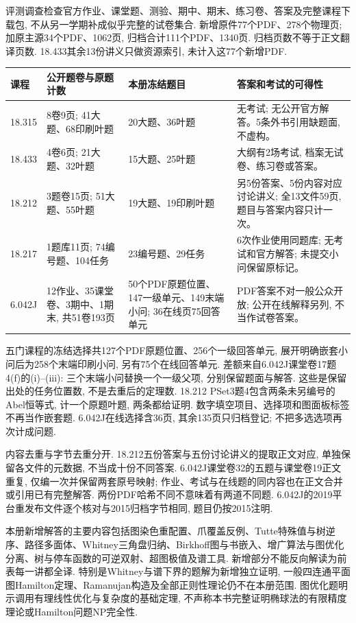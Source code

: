 评测调查检查官方作业、课堂题、测验、期中、期末、练习卷、答案及完整课程下载包, 不从另一学期补成似乎完整的试卷集合. 新增原件77个PDF、278个物理页; 加原主源34个PDF、1062页, 归档合计111个PDF、1340页. 归档页数不等于正文翻译页数. 18.433其余13份讲义只做资源索引, 未计入这77个新增PDF.
\begin{longtable}{p{24mm}p{37mm}p{36mm}p{50mm}}
\toprule 课程 & 公开题卷与原题计数 & 本册冻结题目 & 答案和考试的可得性\\\midrule\endhead
18.315 & 8卷9页; 41大题、68印刷叶题 & 20大题、36叶题 & 无考试; 无公开官方解答。5条外书引用缺题面, 不虚构。\\
18.433 & 4卷6页; 21大题、32叶题 & 15大题、25叶题 & 大纲有2场考试, 档案无试卷、练习卷或答案。\\
18.212 & 3题卷15页; 51大题、55叶题 & 19大题、19印刷叶题 & 另5份答案、5份内容对应讨论讲义; 全13文件59页, 题目与答案内容只计一次。\\
18.217 & 1题库11页; 74编号题、104任务 & 23编号题、29任务 & 6次作业使用同题库; 无考试和官方解答; 未提交小问保留原标记。\\
6.042J & 12作业、35课堂卷、3期中、1期末, 共51卷193页 & 50个PDF原题位置、147一级单元、149末端小问; 36在线页75回答单元 & PDF答案不对一般公众开放; 公开在线解释另列, 不当作试卷答案。\\\bottomrule
\end{longtable}
五门课程的冻结选择共127个PDF原题位置、256个一级回答单元, 展开明确嵌套小问后为258个末端印刷小问, 另有75个在线回答单元. 差额来自6.042J课堂卷17题4(f)的(i)--(iii): 三个末端小问替换一个一级父项, 分别保留题面与解答. 这些是保留出处的任务位置数, 不是去重后的定理数. 18.212 PSet3题4包含两条未另编号的Abel恒等式, 计一个原题叶题, 两条都给证明. 数字填空项目、选择项和图面板标签不再当作嵌套题. 6.042J在线选择含36页, 其余135页只归档登记; 不把多选选项再次计成问题.

内容去重与字节去重分开. 18.212五份答案与五份讨论讲义的提取正文对应, 单独保留各文件的元数据, 不当成十份不同答案. 6.042J课堂卷32的五题与课堂卷19正文重复, 仅编一次并保留两套原号映射; 作业、考试与在线题的同内容也在正文合并或引用已有完整解答. 两份PDF哈希不同不意味着有两道不同题. 6.042J的2019平台重发布文件逐个核对与2015归档字节相同, 题目仍按2015注明.

本册新增解答的主要内容包括图染色重配置、爪覆盖反例、Tutte特殊值与树逆序、路径多面体、Whitney三角盘归纳、Birkhoff图与书嵌入、增广算法与图优化分离、树与停车函数的可逆双射、超图极值及谱工具. 新增部分不能反向解读为前表每一讲都全译. 特别是Whitney与谱下界的题解为新增独立证明, 一般四连通平面图Hamilton定理、Ramanujan构造及全部正则性理论仍不在本册范围. 图优化题明示调用有理线性优化与复杂度的基础定理, 不声称本书完整证明椭球法的有限精度理论或Hamilton问题NP完全性.

